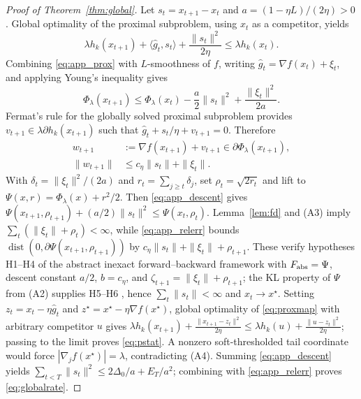 \documentclass{article}
\newcommand{\dist}{\operatorname{dist}}
\begin{document}
\medskip
\begin{proof}[Proof of Theorem~\ref{thm:global}]
Let $s_t=x_{t+1}-x_t$ and $a=(1-\eta L)/(2\eta)>0$. Global optimality of the proximal subproblem, using $x_t$ as a competitor, yields
\begin{equation}
\lambda h_k(x_{t+1})+\langle \widehat g_t,s_t\rangle+\frac{\|s_t\|^2}{2\eta}
\le \lambda h_k(x_t).
\label{eq:app_prox}
\end{equation}
Combining \eqref{eq:app_prox} with $L$-smoothness of $f$, writing $\widehat g_t=\nabla f(x_t)+\xi_t$, and applying Young's inequality gives
\begin{equation}
\Phi_\lambda(x_{t+1})\le \Phi_\lambda(x_t)-\frac a2\|s_t\|^2+\frac{\|\xi_t\|^2}{2a}.
\label{eq:app_descent}
\end{equation}
Fermat's rule for the globally solved proximal subproblem provides $v_{t+1}\in\lambda\partial h_k(x_{t+1})$ such that
$\widehat g_t+s_t/\eta+v_{t+1}=0$. Therefore
\begin{align}
w_{t+1}&:=\nabla f(x_{t+1})+v_{t+1}\in\partial\Phi_\lambda(x_{t+1}),\nonumber\\
\|w_{t+1}\|&\le c_\eta\|s_t\|+\|\xi_t\|.
\label{eq:app_relerr}
\end{align}
With $\delta_t=\|\xi_t\|^2/(2a)$ and $r_t=\sum_{j\ge t}\delta_j$, set $\rho_t=\sqrt{2r_t}$ and lift to $\Psi(x,r)=\Phi_\lambda(x)+r^2/2$. Then \eqref{eq:app_descent} gives $\Psi(x_{t+1},\rho_{t+1})+(a/2)\|s_t\|^2\le\Psi(x_t,\rho_t)$. Lemma~\ref{lem:fd} and (A3) imply $\sum_t(\|\xi_t\|+\rho_t)<\infty$, while \eqref{eq:app_relerr} bounds $\dist(0,\partial\Psi(x_{t+1},\rho_{t+1}))$ by $c_\eta\|s_t\|+\|\xi_t\|+\rho_{t+1}$. These verify hypotheses H1--H4 of the abstract inexact forward--backward framework \cite{bonettini2023abstract} with $F_{\rm abs}=\Psi$, descent constant $a/2$, $b=c_\eta$, and $\zeta_{t+1}=\|\xi_t\|+\rho_{t+1}$; the KL property of $\Psi$ from (A2) supplies H5--H6 \cite{attouch2013convergence}, hence $\sum_t\|s_t\|<\infty$ and $x_t\to x^\star$. Setting $z_t=x_t-\eta\widehat g_t$ and $z^\star=x^\star-\eta\nabla f(x^\star)$, global optimality of \eqref{eq:proxmap} with arbitrary competitor $u$ gives $\lambda h_k(x_{t+1})+\frac{\|x_{t+1}-z_t\|^2}{2\eta}\le\lambda h_k(u)+\frac{\|u-z_t\|^2}{2\eta}$; passing to the limit proves \eqref{eq:pstat}. A nonzero soft-thresholded tail coordinate would force $|\nabla_j f(x^\star)|=\lambda$, contradicting (A4). Summing \eqref{eq:app_descent} yields $\sum_{t<T}\|s_t\|^2\le2\Delta_0/a+E_T/a^2$; combining with \eqref{eq:app_relerr} proves \eqref{eq:globalrate}.
\end{proof}
\end{document}

